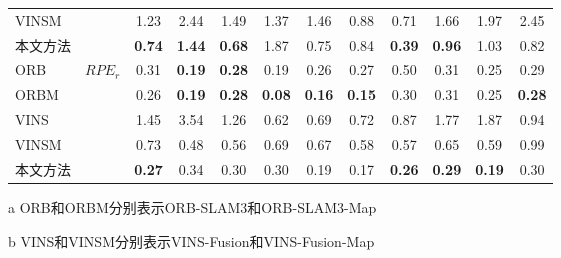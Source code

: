 \begin{table}
\begin{threeparttable}
\begin{tabular}{lccccccccccc}
VINSM &                       & 1.23          & 2.44          & 1.49          & 1.37          & 1.46          & 0.88          & 0.71          & 1.66          & 1.97          & 2.45          \\
本文方法    &                       & \cellcolor[HTML]{FFCCC9}\textbf{0.74} & \cellcolor[HTML]{FFCCC9}\textbf{1.44} & \cellcolor[HTML]{FFCCC9}\textbf{0.68} & 1.87          & 0.75          & 0.84          & \cellcolor[HTML]{FFCCC9}\textbf{0.39} & \cellcolor[HTML]{FFCCC9}\textbf{0.96} & 1.03          & 0.82          \\ \midrule
ORB   & \multirow{5}{*}{$RPE_r$\textdownarrow{}} & 0.31          & \cellcolor[HTML]{FFCCC9}\textbf{0.19} & \cellcolor[HTML]{FFCCC9}\textbf{0.28} & 0.19          & 0.26          & 0.27          & 0.50          & 0.31          & 0.25          & 0.29          \\
ORBM  &                       & 0.26          & \cellcolor[HTML]{FFCCC9}\textbf{0.19} & \cellcolor[HTML]{FFCCC9}\textbf{0.28} & \cellcolor[HTML]{FFCCC9}\textbf{0.08} & \cellcolor[HTML]{FFCCC9}\textbf{0.16} & \cellcolor[HTML]{FFCCC9}\textbf{0.15} & 0.30          & 0.31          & 0.25          & \cellcolor[HTML]{FFCCC9}\textbf{0.28} \\
VINS  &                       & 1.45          & 3.54          & 1.26          & 0.62          & 0.69          & 0.72          & 0.87          & 1.77          & 1.87          & 0.94          \\
VINSM &                       & 0.73          & 0.48          & 0.56          & 0.69          & 0.67          & 0.58          & 0.57          & 0.65          & 0.59          & 0.99          \\
本文方法    &                       & \cellcolor[HTML]{FFCCC9}\textbf{0.27} & 0.34          & 0.30          & 0.30          & 0.19          & 0.17          & \cellcolor[HTML]{FFCCC9}\textbf{0.26} & \cellcolor[HTML]{FFCCC9}\textbf{0.29} & \cellcolor[HTML]{FFCCC9}\textbf{0.19} & 0.30          \\ \bottomrule
\end{tabular}
\label{tab:loc_kitti}
\begin{tablenotes}
  \item [a] ORB和ORBM分别表示ORB-SLAM3和ORB-SLAM3-Map
  \item [b] VINS和VINSM分别表示VINS-Fusion和VINS-Fusion-Map
\end{tablenotes}
\end{threeparttable}
\end{table}

